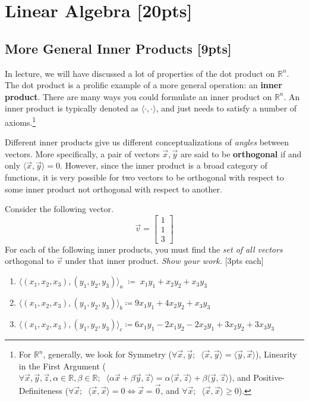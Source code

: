 \section{Linear Algebra [20pts]}



\subsection{More General Inner Products [9pts]}
In lecture, we will have discussed a lot of properties of the dot product on $\mathbb{R}^n$. The dot product is a prolific example of a more general operation: an \textbf{inner product}. There are many ways you could formulate an inner product on $\mathbb{R}^n$. An inner product is typically denoted as $\langle \cdot, \cdot\rangle$, and just needs to satisfy a number of axioms.\footnote{For $\mathbb{R}^n$, generally, we look for Symmetry ($\forall\vec{x},\vec{y};\;\; \langle \vec{x}, \vec{y}\rangle = \langle \vec{y}, \vec{x}\rangle$), Linearity in the First Argument ($\forall\vec{x},\vec{y},\vec{z},\alpha\in\mathbb{R},\beta\in\mathbb{R};\;\; \langle \alpha\vec{x} + \beta \vec{y}, \vec{z}\rangle = \alpha\langle \vec{x}, \vec{z}\rangle + \beta\langle \vec{y}, \vec{z}\rangle$), and Positive-Definiteness ($\forall\vec{x};\;\; \langle\vec{x}, \vec{x}\rangle = 0 \iff \vec{x} = \vec{0}$, and $\forall\vec{x};\;\; \langle \vec{x}, \vec{x} \rangle \geq 0$).}

\smallskip Different inner products give us different conceptualizations of \textit{angles} between vectors. More specifically, a pair of vectors $\vec{x}, \vec{y}$ are said to be \textbf{orthogonal} if and only $\langle \vec{x}, \vec{y}\rangle = 0$. However, since the inner product is a broad category of functions, it is very possible for two vectors to be orthogonal with respect to some inner product not orthogonal with respect to another.

\smallskip Consider the following vector.
$$\vec{v}=\begin{bmatrix}1 \\ 1 \\ 3\end{bmatrix}$$
For each of the following inner products, you must find the \emph{set of all vectors} orthogonal to $\vec{v}$ under that inner product. \emph{Show your work.} [3pts each]

\begin{enumerate}[label=\alph*.]
    \item $\langle (x_1, x_2, x_3), (y_1, y_2, y_3) \rangle_a \;\coloneq\; x_1y_1 + x_2y_2 + x_3y_3$ 
    \item $\langle (x_1, x_2, x_3), (y_1, y_2, y_3) \rangle_b \coloneq 9x_1y_1 + 4x_2y_2 + x_3y_3$
    \item $\langle (x_1, x_2, x_3), (y_1, y_2, y_3) \rangle_c \coloneq 6x_1y_1 - 2x_1y_2 - 2x_2y_1 + 3x_2y_2 + 3x_3y_3$
\end{enumerate}

